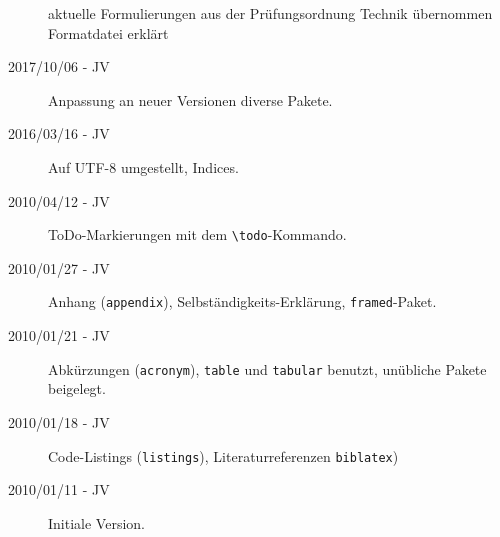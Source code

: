 \begin{description}
	                  aktuelle Formulierungen aus der Prüfungsordnung Technik übernommen\\
	                  Formatdatei erklärt
	\item[2017/10/06 - JV] Anpassung an neuer Versionen diverse Pakete.
	\item[2016/03/16 - JV] Auf UTF-8 umgestellt, Indices.
	\item[2010/04/12 - JV] ToDo-Markierungen mit dem \verb+\todo+-Kommando.
	\item[2010/01/27 - JV] Anhang (\texttt{appendix}), Selbständigkeits-Erklärung, \texttt{framed}-Paket.
	\item[2010/01/21 - JV] Abkürzungen (\texttt{acronym}), \texttt{table} und \texttt{tabular} benutzt,
	     unübliche Pakete beigelegt.
	\item[2010/01/18 - JV] Code-Listings (\texttt{listings}), Literaturreferenzen \texttt{biblatex})
	\item[2010/01/11 - JV] Initiale Version.
\end{description}
